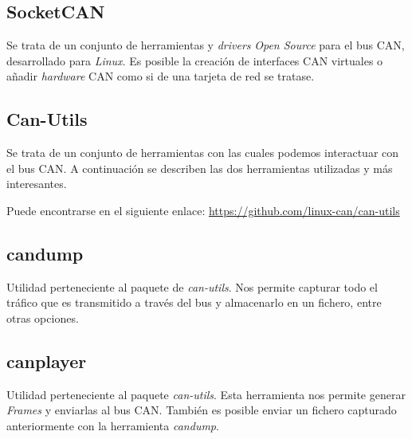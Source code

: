 \subsection{SocketCAN\cite{socket:can}}\label{socketcan}

Se trata de un conjunto de herramientas y \emph{drivers} \emph{Open Source} para el bus CAN, desarrollado para \emph{Linux}. Es posible la creación de interfaces CAN virtuales o añadir \emph{hardware} CAN como si de una tarjeta de red se tratase.


\subsection{Can-Utils}\label{can-utils}

Se trata de un conjunto de herramientas con las cuales podemos interactuar con el bus CAN. A continuación se describen las dos herramientas utilizadas y más interesantes.

Puede encontrarse en el siguiente enlace:
\url{https://github.com/linux-can/can-utils}

\subsection{candump}\label{candump-utils}

Utilidad perteneciente al paquete de \emph{can-utils}. Nos permite capturar todo el tráfico que es transmitido a través del bus y almacenarlo en un fichero, entre otras opciones.

\subsection{canplayer}\label{canplayer}

Utilidad perteneciente al paquete \emph{can-utils}. Esta herramienta nos permite generar \emph{Frames} y enviarlas al bus CAN. También es posible enviar un fichero capturado anteriormente con la herramienta \emph{candump}.



